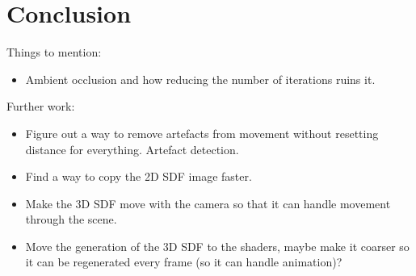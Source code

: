 \chapter{Conclusion}
\label{chapter5}

Things to mention:

\begin{itemize}
	\item Ambient occlusion and how reducing the number of iterations ruins it.
\end{itemize}

Further work:

\begin{itemize}
	\item Figure out a way to remove artefacts from movement without resetting distance for everything. Artefact detection.
	\item Find a way to copy the 2D SDF image faster.
	\item Make the 3D SDF move with the camera so that it can handle movement through the scene.
	\item Move the generation of the 3D SDF to the shaders, maybe make it coarser so it can be regenerated every frame (so it can handle animation)?
\end{itemize}